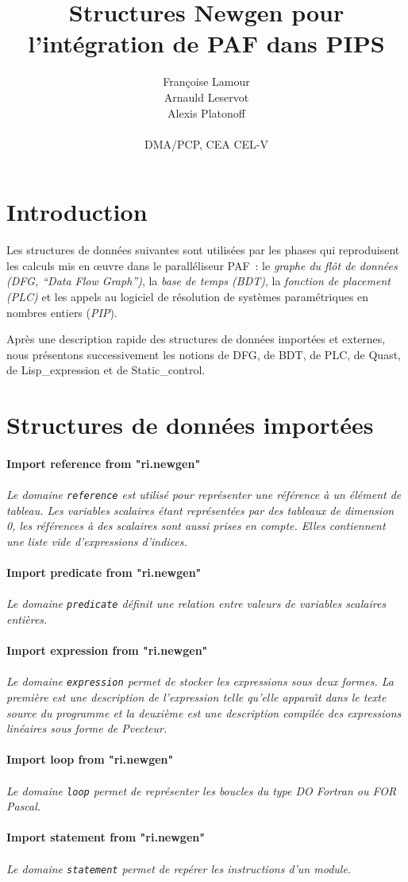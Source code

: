 \documentclass{article}
\title{Structures Newgen pour l'int\'egration de PAF dans PIPS}
\author{Fran\c{c}oise Lamour \\
        Arnauld Leservot \\
        Alexis Platonoff \\
        \\
        DMA/PCP, CEA CEL-V}
\newcommand{\domain}[2]{\paragraph{{#1}}\paragraph{}{\em #2}}
\begin{document}
\maketitle

\section*{Introduction}

Les structures de donn\'ees suivantes sont utilis\'ees par les phases qui 
reproduisent les calculs mis en \oe uvre dans le parall\'eliseur PAF~: le {\em 
graphe du fl\^ot de donn\'ees (DFG, ``Data Flow Graph'')}, la {\em base de 
temps (BDT)}, la {\em fonction de placement (PLC)} et les appels au logiciel de
r\'esolution de syst\`emes param\'etriques en nombres entiers ({\em PIP}).

Apr\`es une description rapide des structures de donn\'ees import\'ees et 
externes, nous pr\'esentons successivement les notions de DFG, de BDT, de PLC, 
de Quast, de Lisp\_expression et de Static\_control.

\section{Structures de donn\'ees import\'ees}

\domain{Import reference from "ri.newgen"}
{Le domaine {\tt reference} est utilis\'e pour repr\'esenter une r\'ef\'erence 
\`a un \'el\'ement de tableau. Les variables scalaires \'etant repr\'esent\'ees
par des tableaux de dimension 0, les r\'ef\'erences \`a des scalaires sont 
aussi prises en compte. Elles contiennent une liste vide d'expressions 
d'indices.}

\domain{Import predicate from "ri.newgen"}
{Le domaine {\tt predicate} d\'efinit une relation entre valeurs de variables 
scalaires enti\`eres.}

\domain{Import expression from "ri.newgen"}
{Le domaine {\tt expression} permet de stocker les expressions sous deux 
formes. La premi\`ere est une description de l'expression telle qu'elle 
appara\^{\i}t dans le texte source du programme et la deuxi\`eme est une 
description compil\'ee des expressions lin\'eaires sous forme de Pvecteur.}

\domain{Import loop from "ri.newgen"}
{Le domaine {\tt loop} permet de repr\'esenter les boucles du type DO Fortran ou
FOR Pascal.}

\domain{Import statement from "ri.newgen"}
{Le domaine {\tt statement} permet de rep\'erer les instructions d'un module.}
\end{document}
